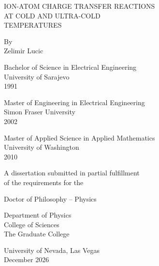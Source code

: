 
\begin{titlepage}
\thispagestyle{empty}
\normalsize
\begin{center}

\vspace*{0.45in}

\begin{doublespacing}
ION-ATOM CHARGE TRANSFER REACTIONS \\ AT COLD AND ULTRA-COLD \\ TEMPERATURES\par
\end{doublespacing}
\tagmcend
\tagstructend

\vspace{0.25in}

By\\[2\baselineskip]
Zelimir Lucic

\vspace{0.25in}

Bachelor of Science in Electrical Engineering\\
University of Sarajevo\\
1991

\vspace{0.25in}

Master of Engineering in Electrical Engineering\\
Simon Fraser University\\
2002

\vspace{0.25in}

Master of Applied Science in Applied Mathematics\\
University of Washington\\
2010

\vspace{0.45in}

A dissertation submitted in partial fulfillment\\
of the requirements for the

\vspace{0.15in}

Doctor of Philosophy -- Physics

\vspace{0.45in}

Department of Physics\\
College of Sciences\\
The Graduate College

\vspace{0.15in}

University of Nevada, Las Vegas \\December 2026

\end{center}
\end{titlepage}
